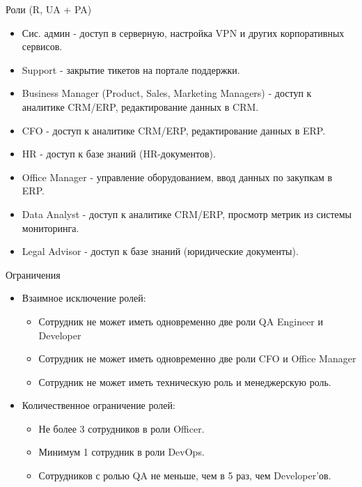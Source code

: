 \documentclass[10pt]{beamer}
\begin{document}
\begin{frame}{Роли (R, UA + PA)}
    \begin{itemize}
        \item Сис. админ - доступ в серверную, настройка VPN и других корпоративных сервисов.
        \item Support - закрытие тикетов на портале поддержки.
        \item Business Manager (Product, Sales, Marketing Managers) - доступ к аналитике CRM/ERP, редактирование данных в CRM.
        \item CFO - доступ к аналитике CRM/ERP, редактирование данных в ERP.
        \item HR - доступ к базе знаний (HR-документов).
        \item Office Manager - управление оборудованием, ввод данных по закупкам в ERP.
        \item Data Analyst - доступ к аналитике CRM/ERP, просмотр метрик из системы мониторинга.
        \item Legal Advisor - доступ к базе знаний (юридические документы).
    \end{itemize}
\end{frame}

\begin{frame}{Ограничения}
    \begin{itemize}
        \item Взаимное исключение ролей:
        \begin{itemize}
            \item Сотрудник не может иметь одновременно две роли QA Engineer и Developer
            \item Сотрудник не может иметь одновременно две роли CFO и Office Manager
            \item Сотрудник не может иметь техническую роль и менеджерскую роль.
        \end{itemize}
        \item Количественное ограничение ролей:
        \begin{itemize}
            \item Не более 3 сотрудников в роли Officer.
            \item Минимум 1 сотрудник в роли DevOps.
            \item Сотрудников с ролью QA не меньше, чем в 5 раз, чем Developer'ов.
        \end{itemize}
    \end{itemize}
\end{frame}
\end{document}
